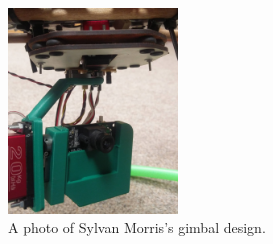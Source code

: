 \begin{figure}[h!]
  \centering
  \includegraphics[width=0.4\textwidth]{literature_review/sylvan_gimbal.jpg}
  \caption{\label{fig:sylvan_gimbal} A photo of Sylvan Morris's gimbal design.}
\end{figure}

